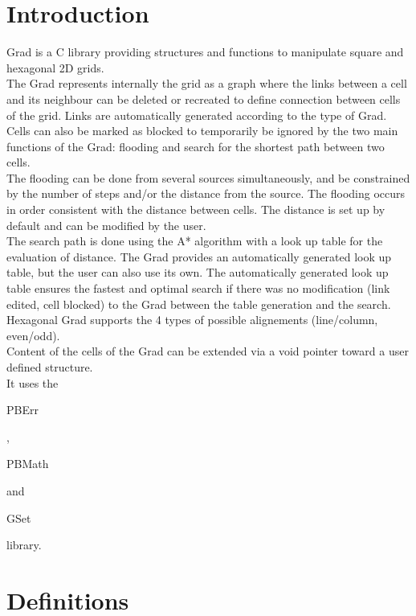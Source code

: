 \section*{Introduction}

Grad is a C library providing structures and functions to manipulate square and hexagonal 2D grids.\\

The Grad represents internally the grid as a graph where the links between a cell and its neighbour can be deleted or recreated to define connection between cells of the grid. Links are automatically generated according to the type of Grad. Cells can also be marked as blocked to temporarily be ignored by the two main functions of the Grad: flooding and search for the shortest path between two cells.\\

The flooding can be done from several sources simultaneously, and be constrained by the number of steps and/or the distance from the source. The flooding occurs in order consistent with the distance between cells. The distance is set up by default and can be modified by the user.\\

The search path is done using the A* algorithm with a look up table for the evaluation of distance. The Grad provides an automatically generated look up table, but the user can also use its own. The automatically generated look up table ensures the fastest and optimal search if there was no modification (link edited, cell blocked) to the Grad between the table generation and the search.\\

Hexagonal Grad supports the 4 types of possible alignements (line/column, even/odd).\\

Content of the cells of the Grad can be extended via a void pointer toward a user defined structure.\\

It uses the \begin{ttfamily}PBErr\end{ttfamily}, \begin{ttfamily}PBMath\end{ttfamily} and \begin{ttfamily}GSet\end{ttfamily} library.\\

\section{Definitions}


